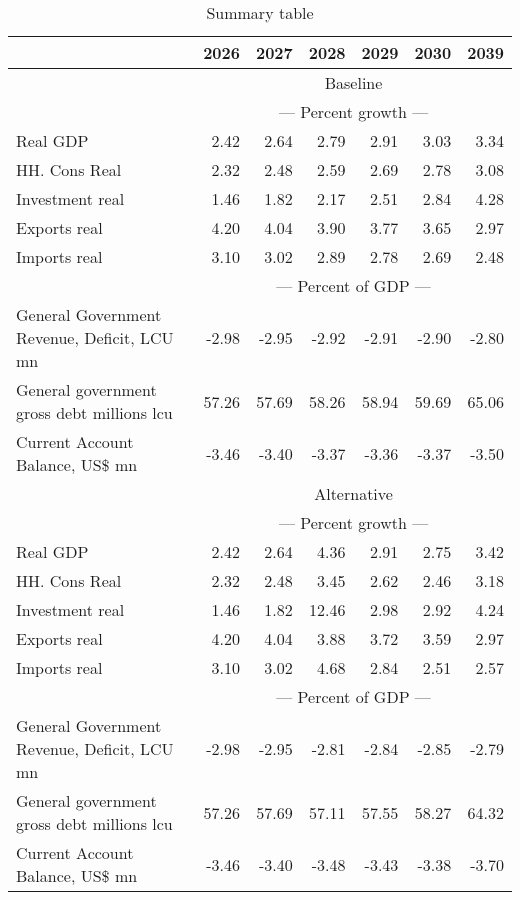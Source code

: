 \documentclass{article}
\begin{document}
\begin{table}[ht]
\caption{Summary table}
\begin{tabular}{lrrrrr|r}
\toprule
 & 2026 & 2027 & 2028 & 2029 & 2030 & 2039 \\
\midrule
&\multicolumn{6}{c}{{Baseline}}                               \\
&\multicolumn{6}{c}{{--- Percent growth ---}}                               \\
Real GDP & 2.42 & 2.64 & 2.79 & 2.91 & 3.03 & 3.34 \\
HH. Cons Real & 2.32 & 2.48 & 2.59 & 2.69 & 2.78 & 3.08 \\
Investment real & 1.46 & 1.82 & 2.17 & 2.51 & 2.84 & 4.28 \\
Exports real & 4.20 & 4.04 & 3.90 & 3.77 & 3.65 & 2.97 \\
Imports real & 3.10 & 3.02 & 2.89 & 2.78 & 2.69 & 2.48 \\
&\multicolumn{6}{c}{{--- Percent of GDP ---}}                               \\
General Government Revenue, Deficit, LCU mn & -2.98 & -2.95 & -2.92 & -2.91 & -2.90 & -2.80 \\
General government gross debt millions lcu & 57.26 & 57.69 & 58.26 & 58.94 & 59.69 & 65.06 \\
Current Account Balance, US\$ mn & -3.46 & -3.40 & -3.37 & -3.36 & -3.37 & -3.50 \\
&\multicolumn{6}{c}{{Alternative}}                               \\
&\multicolumn{6}{c}{{--- Percent growth ---}}                               \\
Real GDP & 2.42 & 2.64 & 4.36 & 2.91 & 2.75 & 3.42 \\
HH. Cons Real & 2.32 & 2.48 & 3.45 & 2.62 & 2.46 & 3.18 \\
Investment real & 1.46 & 1.82 & 12.46 & 2.98 & 2.92 & 4.24 \\
Exports real & 4.20 & 4.04 & 3.88 & 3.72 & 3.59 & 2.97 \\
Imports real & 3.10 & 3.02 & 4.68 & 2.84 & 2.51 & 2.57 \\
&\multicolumn{6}{c}{{--- Percent of GDP ---}}                               \\
General Government Revenue, Deficit, LCU mn & -2.98 & -2.95 & -2.81 & -2.84 & -2.85 & -2.79 \\
General government gross debt millions lcu & 57.26 & 57.69 & 57.11 & 57.55 & 58.27 & 64.32 \\
Current Account Balance, US\$ mn & -3.46 & -3.40 & -3.48 & -3.43 & -3.38 & -3.70 \\

\end{tabular}
\end{table}
\end{document}
